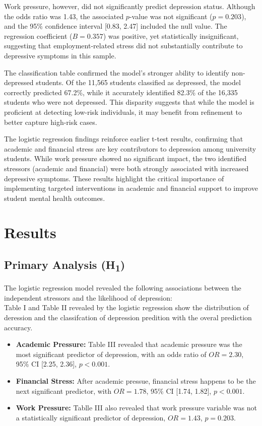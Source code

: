 \documentclass[conference]{IEEEtran}
\begin{document}
Work pressure, however, did not significantly predict depression status. Although the odds ratio was 1.43, the associated $p$-value was not significant ($p = 0.203$), and the 95\% confidence interval [0.83, 2.47] included the null value. The regression coefficient ($B = 0.357$) was positive, yet statistically insignificant, suggesting that employment-related stress did not substantially contribute to depressive symptoms in this sample.

The classification table confirmed the model's stronger ability to identify non-depressed students. Of the 11,565 students classified as depressed, the model correctly predicted 67.2\%, while it accurately identified 82.3\% of the 16,335 students who were not depressed. This disparity suggests that while the model is proficient at detecting low-risk individuals, it may benefit from refinement to better capture high-risk cases.

The logistic regression findings reinforce earlier t-test results, confirming that academic and financial stress are key contributors to depression among university students. While work pressure showed no significant impact, the two identified stressors (academic and financial) were both strongly associated with increased depressive symptoms. These results highlight the critical importance of implementing targeted interventions in academic and financial support to improve student mental health outcomes.

\section{Results}

\subsection{Primary Analysis (H\textsubscript{1})}
The logistic regression model revealed the following associations between the independent stressors and the likelihood of depression: \\
Table I and Table II revealed by the logistic regression show the distribution of deression and the classifcation of depression predition with the overal prediction accuracy.

\begin{itemize}
    \item \textbf{Academic Pressure:} Table III revealed that academic pressure was the most significant predictor of depression, with an odds ratio of $OR = 2.30$, 95\% CI [2.25, 2.36], $p < 0.001$.
    \item \textbf{Financial Stress:} After academic pressue, financial stress happens to be the next significant predictor, with $OR = 1.78$, 95\% CI [1.74, 1.82], $p < 0.001$.
    \item \textbf{Work Pressure:} Tablle III also revealed that work pressure variable was not a statistically significant predictor of depression, $OR = 1.43$, $p = 0.203$.
\end{itemize}
\end{document}
